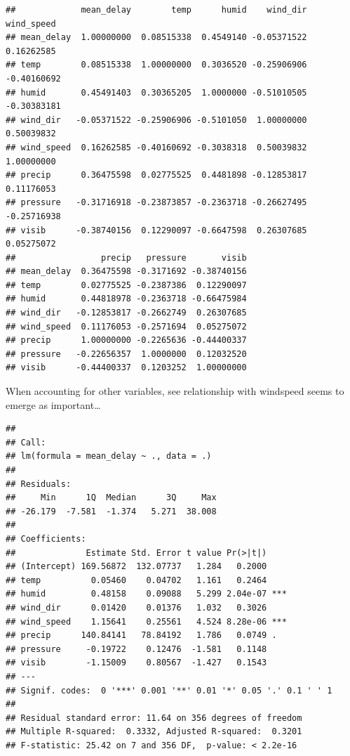 \documentclass[]{book}
\newenvironment{Shaded}{\begin{snugshade}}{\end{snugshade}}
\newcommand{\DataTypeTok}[1]{\textcolor[rgb]{0.13,0.29,0.53}{#1}}
\newcommand{\KeywordTok}[1]{\textcolor[rgb]{0.13,0.29,0.53}{\textbf{#1}}}
\newcommand{\NormalTok}[1]{#1}
\newcommand{\OperatorTok}[1]{\textcolor[rgb]{0.81,0.36,0.00}{\textbf{#1}}}
\newcommand{\StringTok}[1]{\textcolor[rgb]{0.31,0.60,0.02}{#1}}
\theoremstyle{definition}
\theoremstyle{definition}
\theoremstyle{definition}
\theoremstyle{remark}
\begin{document}
\begin{verbatim}
##             mean_delay        temp      humid    wind_dir  wind_speed
## mean_delay  1.00000000  0.08515338  0.4549140 -0.05371522  0.16262585
## temp        0.08515338  1.00000000  0.3036520 -0.25906906 -0.40160692
## humid       0.45491403  0.30365205  1.0000000 -0.51010505 -0.30383181
## wind_dir   -0.05371522 -0.25906906 -0.5101050  1.00000000  0.50039832
## wind_speed  0.16262585 -0.40160692 -0.3038318  0.50039832  1.00000000
## precip      0.36475598  0.02775525  0.4481898 -0.12853817  0.11176053
## pressure   -0.31716918 -0.23873857 -0.2363718 -0.26627495 -0.25716938
## visib      -0.38740156  0.12290097 -0.6647598  0.26307685  0.05275072
##                 precip   pressure       visib
## mean_delay  0.36475598 -0.3171692 -0.38740156
## temp        0.02775525 -0.2387386  0.12290097
## humid       0.44818978 -0.2363718 -0.66475984
## wind_dir   -0.12853817 -0.2662749  0.26307685
## wind_speed  0.11176053 -0.2571694  0.05275072
## precip      1.00000000 -0.2265636 -0.44400337
## pressure   -0.22656357  1.0000000  0.12032520
## visib      -0.44400337  0.1203252  1.00000000
\end{verbatim}

When accounting for other variables, see relationship with windspeed
seems to emerge as important\ldots{}

\begin{Shaded}
\end{Shaded}

\begin{verbatim}
## 
## Call:
## lm(formula = mean_delay ~ ., data = .)
## 
## Residuals:
##     Min      1Q  Median      3Q     Max 
## -26.179  -7.581  -1.374   5.271  38.008 
## 
## Coefficients:
##              Estimate Std. Error t value Pr(>|t|)    
## (Intercept) 169.56872  132.07737   1.284   0.2000    
## temp          0.05460    0.04702   1.161   0.2464    
## humid         0.48158    0.09088   5.299 2.04e-07 ***
## wind_dir      0.01420    0.01376   1.032   0.3026    
## wind_speed    1.15641    0.25561   4.524 8.28e-06 ***
## precip      140.84141   78.84192   1.786   0.0749 .  
## pressure     -0.19722    0.12476  -1.581   0.1148    
## visib        -1.15009    0.80567  -1.427   0.1543    
## ---
## Signif. codes:  0 '***' 0.001 '**' 0.01 '*' 0.05 '.' 0.1 ' ' 1
## 
## Residual standard error: 11.64 on 356 degrees of freedom
## Multiple R-squared:  0.3332, Adjusted R-squared:  0.3201 
## F-statistic: 25.42 on 7 and 356 DF,  p-value: < 2.2e-16
\end{verbatim}
\end{document}
